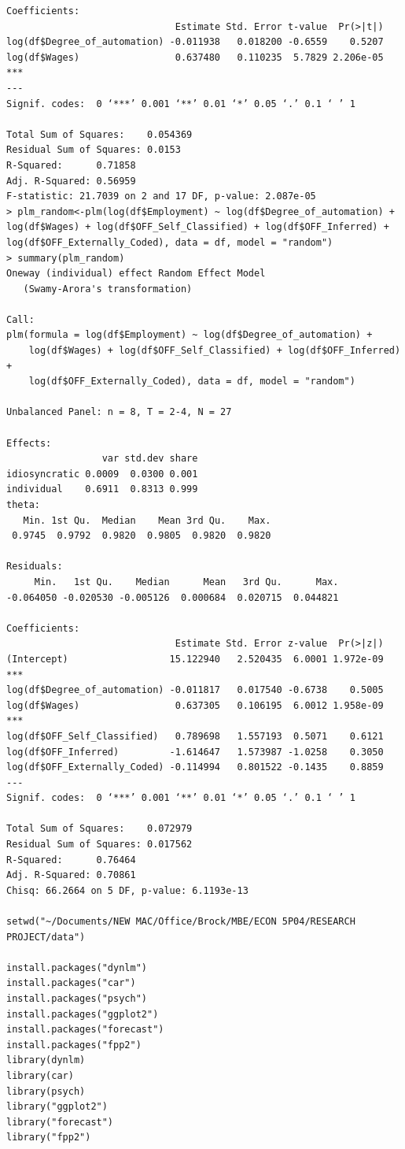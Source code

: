 \documentclass[12pt]{article}
\begin{document}
\begin{verbatim}
Coefficients:
                              Estimate Std. Error t-value  Pr(>|t|)    
log(df$Degree_of_automation) -0.011938   0.018200 -0.6559    0.5207    
log(df$Wages)                 0.637480   0.110235  5.7829 2.206e-05 ***
---
Signif. codes:  0 ‘***’ 0.001 ‘**’ 0.01 ‘*’ 0.05 ‘.’ 0.1 ‘ ’ 1

Total Sum of Squares:    0.054369
Residual Sum of Squares: 0.0153
R-Squared:      0.71858
Adj. R-Squared: 0.56959
F-statistic: 21.7039 on 2 and 17 DF, p-value: 2.087e-05
> plm_random<-plm(log(df$Employment) ~ log(df$Degree_of_automation) + log(df$Wages) + log(df$OFF_Self_Classified) + log(df$OFF_Inferred) + log(df$OFF_Externally_Coded), data = df, model = "random")
> summary(plm_random)
Oneway (individual) effect Random Effect Model 
   (Swamy-Arora's transformation)

Call:
plm(formula = log(df$Employment) ~ log(df$Degree_of_automation) + 
    log(df$Wages) + log(df$OFF_Self_Classified) + log(df$OFF_Inferred) + 
    log(df$OFF_Externally_Coded), data = df, model = "random")

Unbalanced Panel: n = 8, T = 2-4, N = 27

Effects:
                 var std.dev share
idiosyncratic 0.0009  0.0300 0.001
individual    0.6911  0.8313 0.999
theta:
   Min. 1st Qu.  Median    Mean 3rd Qu.    Max. 
 0.9745  0.9792  0.9820  0.9805  0.9820  0.9820 

Residuals:
     Min.   1st Qu.    Median      Mean   3rd Qu.      Max. 
-0.064050 -0.020530 -0.005126  0.000684  0.020715  0.044821 

Coefficients:
                              Estimate Std. Error z-value  Pr(>|z|)    
(Intercept)                  15.122940   2.520435  6.0001 1.972e-09 ***
log(df$Degree_of_automation) -0.011817   0.017540 -0.6738    0.5005    
log(df$Wages)                 0.637305   0.106195  6.0012 1.958e-09 ***
log(df$OFF_Self_Classified)   0.789698   1.557193  0.5071    0.6121    
log(df$OFF_Inferred)         -1.614647   1.573987 -1.0258    0.3050    
log(df$OFF_Externally_Coded) -0.114994   0.801522 -0.1435    0.8859    
---
Signif. codes:  0 ‘***’ 0.001 ‘**’ 0.01 ‘*’ 0.05 ‘.’ 0.1 ‘ ’ 1

Total Sum of Squares:    0.072979
Residual Sum of Squares: 0.017562
R-Squared:      0.76464
Adj. R-Squared: 0.70861
Chisq: 66.2664 on 5 DF, p-value: 6.1193e-13

setwd("~/Documents/NEW MAC/Office/Brock/MBE/ECON 5P04/RESEARCH PROJECT/data")

install.packages("dynlm")
install.packages("car")
install.packages("psych")
install.packages("ggplot2")
install.packages("forecast")
install.packages("fpp2")
library(dynlm)
library(car)
library(psych)
library("ggplot2")
library("forecast")
library("fpp2")


\end{verbatim}
\end{document}
